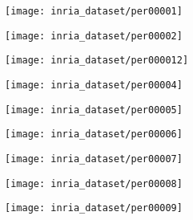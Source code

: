 \begin{figure*}[!t]
  \centering

	\begin{minipage}{2.0\columnwidth}
	  \begin{minipage}{0.1\columnwidth} \centerline{\texttt{[image: inria\_dataset/per00001]}}  \end{minipage} \hfill 
	  \begin{minipage}{0.1\columnwidth} \centerline{\texttt{[image: inria\_dataset/per00002]}}  \end{minipage} \hfill 
	  \begin{minipage}{0.1\columnwidth} \centerline{\texttt{[image: inria\_dataset/per000012]}}  \end{minipage} \hfill 
	  \begin{minipage}{0.1\columnwidth} \centerline{\texttt{[image: inria\_dataset/per00004]}}  \end{minipage} \hfill 
	  \begin{minipage}{0.1\columnwidth} \centerline{\texttt{[image: inria\_dataset/per00005]}}  \end{minipage} \hfill 
	  \begin{minipage}{0.1\columnwidth} \centerline{\texttt{[image: inria\_dataset/per00006]}}  \end{minipage} \hfill 
	  \begin{minipage}{0.1\columnwidth} \centerline{\texttt{[image: inria\_dataset/per00007]}}  \end{minipage} \hfill 
	  \begin{minipage}{0.1\columnwidth} \centerline{\texttt{[image: inria\_dataset/per00008]}}  \end{minipage} \hfill 
	  \begin{minipage}{0.1\columnwidth} \centerline{\texttt{[image: inria\_dataset/per00009]}}  \end{minipage} \hfill
	\end{minipage}


\end{figure*}

